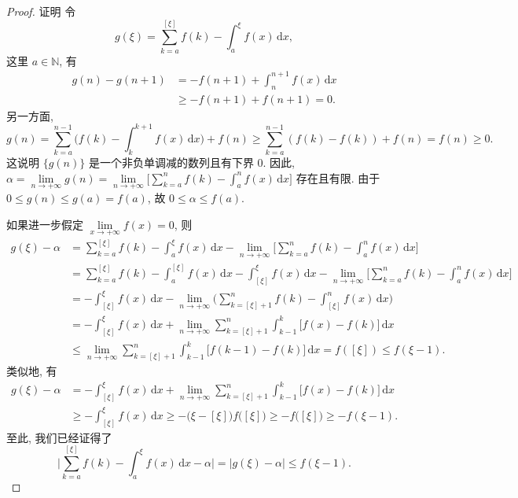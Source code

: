 \begin{proof}
证明 令
\[
  g(\xi)=\sum_{k=a}^{[\xi]}f(k)-\int_{a}^{\xi}f(x)\,\mathrm{d}x,
\]
这里 $a\in\mathbb{N}$, 有
\[
\begin{aligned}
  g(n)-g(n+1)
  &=-f(n+1)+\int_{n}^{n+1}f(x)\,\mathrm{d}x\\
  &\geqslant-f(n+1)+f(n+1)=0.
\end{aligned}
\]
另一方面,
\[
  g(n)=\sum_{k=a}^{n-1}\biggl(f(k)-\int_{k}^{k+1}f(x)\,\mathrm{d}x\biggr)+f(n)
  \geqslant\sum_{k=a}^{n-1}(f(k)-f(k))+f(n)=f(n)\geqslant0.
\]
这说明 $\{g(n)\}$ 是一个非负单调减的数列且有下界 $0$. 因此,
$\alpha=\lim\limits_{n\to+\infty}g(n)
=\lim\limits_{n\to+\infty}\bigl[\sum_{k=a}^{n}f(k)-\int_{a}^{n}f(x)\,\mathrm{d}x\bigr]$
存在且有限. 由于 $0\leqslant g(n)\leqslant g(a)=f(a)$, 故 $0\leqslant\alpha\leqslant f(a)$.

如果进一步假定 $\lim\limits_{x\to+\infty}f(x)=0$, 则
\[
\begin{aligned}
  g(\xi)-\alpha
  &=\sum_{k=a}^{[\xi]}f(k)-\int_{a}^{\xi}f(x)\,\mathrm{d}x
   -\lim_{n\to+\infty}\biggl[\sum_{k=a}^{n}f(k)-\int_{a}^{n}f(x)\,\mathrm{d}x\biggr]\\
  &=\sum_{k=a}^{[\xi]}f(k)-\int_{a}^{[\xi]}f(x)\,\mathrm{d}x
   -\int_{[\xi]}^{\xi}f(x)\,\mathrm{d}x
   -\lim_{n\to+\infty}\biggl[\sum_{k=a}^{n}f(k)-\int_{a}^{n}f(x)\,\mathrm{d}x\biggr]\\
  &=-\int_{[\xi]}^{\xi}f(x)\,\mathrm{d}x
   -\lim_{n\to+\infty}\biggl(\sum_{k=[\xi]+1}^{n}f(k)-\int_{[\xi]}^{n}f(x)\,\mathrm{d}x\biggr)\\
  &=-\int_{[\xi]}^{\xi}f(x)\,\mathrm{d}x
   +\lim_{n\to+\infty}\sum_{k=[\xi]+1}^{n}\int_{k-1}^{k}\bigl[f(x)-f(k)\bigr]\,\mathrm{d}x\\
  &\leqslant\lim_{n\to+\infty}\sum_{k=[\xi]+1}^{n}\int_{k-1}^{k}\bigl[f(k-1)-f(k)\bigr]\,\mathrm{d}x
   =f([\xi])\leqslant f(\xi-1).
\end{aligned}
\]
类似地, 有
\[
\begin{aligned}
  g(\xi)-\alpha
  &=-\int_{[\xi]}^{\xi}f(x)\,\mathrm{d}x
   +\lim_{n\to+\infty}\sum_{k=[\xi]+1}^{n}\int_{k-1}^{k}\bigl[f(x)-f(k)\bigr]\,\mathrm{d}x\\
  &\geqslant-\int_{[\xi]}^{\xi}f(x)\,\mathrm{d}x
   \geqslant-\bigl(\xi-[\xi]\bigr)f\bigl([\xi]\bigr)
   \geqslant-f\bigl([\xi]\bigr)\geqslant-f(\xi-1).
\end{aligned}
\]
至此, 我们已经证得了
\[
  \biggl|\sum_{k=a}^{[\xi]}f(k)-\int_{a}^{\xi}f(x)\,\mathrm{d}x-\alpha\biggr|
  =|g(\xi)-\alpha|\leqslant f(\xi-1).
\]
\end{proof}

